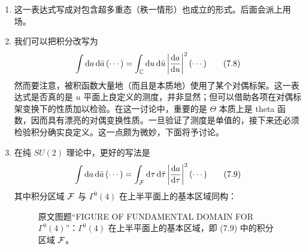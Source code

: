 \begin{enumerate}
\item 这一表达式写成对包含超多重态（秩一情形）也成立的形式。后面会派上用场。
\item 我们可以把积分改写为
\begin{equation}
\int\mathrm{d} a\,\mathrm{d}\bar a\,(\cdots)=\int_{\mathbb{C}}\mathrm{d} u\,\mathrm{d}\bar u\left|\frac{\mathrm{d} a}{\mathrm{d} u}\right|^{2}(\cdots)
\tag{7.8}
\end{equation}
然而要注意，被积函数大量地（而且是本质地）使用了某个对偶标架。这一表达式是否真的是 $u$ 平面上良定义的测度，并非显然；但可以借助各项在对偶标架变换下的性质加以检验。在这一讨论中，重要的是 $\Theta$ 本质上是 theta 函数，因而具有漂亮的对偶变换性质。一旦验证了测度是单值的，接下来还必须检验积分确实良定义。这一点颇为微妙，下面将予讨论。
\item 在纯 $SU(2)$ 理论中，更好的写法是
\begin{equation}
\int\mathrm{d} a\,\mathrm{d}\bar a\,(\cdots)=\int_{\mathcal{F}}\mathrm{d}\tau\,\mathrm{d}\bar\tau\left|\frac{\mathrm{d} a}{\mathrm{d}\tau}\right|^{2}(\cdots)
\tag{7.9}
\end{equation}
其中积分区域 $\mathcal{F}$ 与 $\Gamma^{0}(4)$ 在上半平面上的基本区域同构：
\begin{figure}[H]
  \centering
  \caption{原文图题“FIGURE OF FUNDAMENTAL DOMAIN FOR $\Gamma^{0}(4)$”：$\Gamma^{0}(4)$ 在上半平面上的基本区域，即 (7.9) 中的积分区域 $\mathcal{F}$。}
  \label{fig:gamma0-4}
\end{figure}


\end{enumerate}
